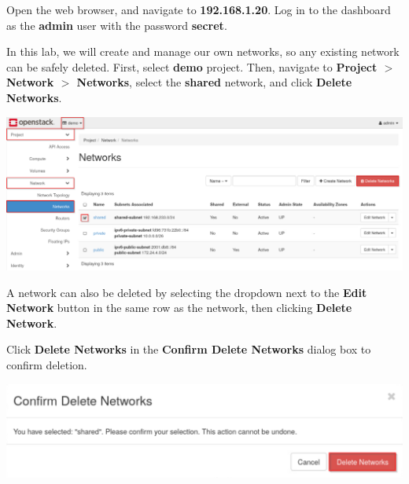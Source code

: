 \documentclass[letterpaper, 12pt]{article}
\begin{document}
\begin{enumerate}
    \begin{labstep}
        Open the web browser, and navigate to \textbf{192.168.1.20}.
        Log in to the dashboard as the \textbf{admin} user with the password \textbf{secret}.
    \end{labstep}

    \begin{labstep}
        In this lab, we will create and manage our own networks, so any existing network can be safely deleted.
        First, select \textbf{demo} project.
        Then, navigate to \textbf{Project $>$ Network $>$ Networks}, select the \textbf{shared} network, and click \textbf{Delete Networks}.

        \begin{center}
            \includegraphics[width=\linewidth]{images/part3/step2.png}
        \end{center}
    \end{labstep}

    \begin{tipbox}
        A network can also be deleted by selecting the dropdown next to the \textbf{Edit Network} button in the same row as the network, then clicking \textbf{Delete Network}.
    \end{tipbox}

    \begin{labstep}
        Click \textbf{Delete Networks} in the \textbf{Confirm Delete Networks} dialog box to confirm deletion.

        \begin{center}
            \includegraphics[width=\linewidth]{images/part3/step3.png}
        \end{center}
    \end{labstep}


\end{enumerate}
\end{document}
